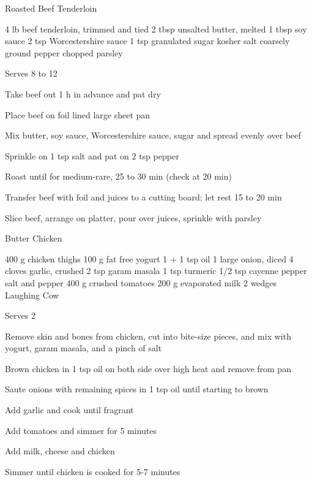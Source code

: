 \begin{denserecipe}{Roasted Beef Tenderloin}{}
\begin{ingredients}
4 lb beef tenderloin, trimmed and tied
2 tbsp unsalted butter, melted
1 tbsp soy sauce
2 tsp Worcestershire sauce
1 tsp granulated sugar
kosher salt
coarsely ground pepper
chopped parsley
\end{ingredients}
\nextcolumn
Serves 8 to 12
\begin{steps}
\item Take beef out 1 h in advance and pat dry
\item Place beef on foil lined large sheet pan
\item Mix butter, soy sauce, Worcestershire sauce, sugar and spread evenly over beef
\item Sprinkle on 1 tsp salt and pat on 2 tsp pepper
\item Roast until  for medium-rare, 25 to 30 min (check at 20 min)
\item Transfer beef with foil and juices to a cutting board; let rest 15 to 20 min
\item Slice beef, arrange on platter, pour over juices, sprinkle with parsley
\end{steps}
\end{denserecipe}

\begin{denserecipe}{Butter Chicken}{}
\begin{ingredients}
400 g chicken thighs
100 g fat free yogurt
1 + 1 tsp oil
1 large onion, diced
4 cloves garlic, crushed
2 tsp garam masala
1 tsp turmeric
1/2 tsp cayenne pepper
salt and pepper
400 g crushed tomatoes
200 g evaporated milk
2 wedges Laughing Cow
\end{ingredients}
\nextcolumn
Serves 2
\begin{steps}
\item Remove skin and bones from chicken, cut into bite-size pieces, and mix with yogurt, garam masala, and a pinch of salt
\item Brown chicken in 1 tsp oil on both side over high heat and remove from pan
\item Saute onions with remaining spices in 1 tsp oil until starting to brown
\item Add garlic and cook until fragrant
\item Add tomatoes and simmer for 5 minutes
\item Add milk, cheese and chicken
\item Simmer until chicken is cooked for 5-7 minutes
\end{steps}
\end{denserecipe}

